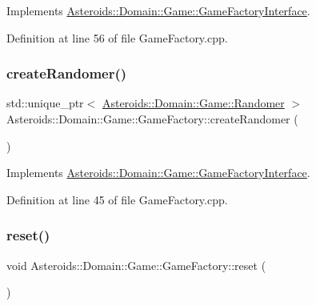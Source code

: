 Implements \hyperlink{classAsteroids_1_1Domain_1_1Game_1_1GameFactoryInterface_a40f7aecd06daa206b762bfc7896bd47c}{Asteroids\+::\+Domain\+::\+Game\+::\+Game\+Factory\+Interface}.



Definition at line 56 of file Game\+Factory.\+cpp.

\mbox{\label{classAsteroids_1_1Domain_1_1Game_1_1GameFactory_ab46d642aa48fd4de15a0de8d7a425f1d}} 
\subsubsection{\texorpdfstring{create\+Randomer()}{createRandomer()}}
{\footnotesize\ttfamily std\+::unique\+\_\+ptr$<$ \hyperlink{classAsteroids_1_1Domain_1_1Game_1_1Randomer}{Asteroids\+::\+Domain\+::\+Game\+::\+Randomer} $>$ Asteroids\+::\+Domain\+::\+Game\+::\+Game\+Factory\+::create\+Randomer (\begin{DoxyParamCaption}{ }\end{DoxyParamCaption})\hspace{0.3cm}{\ttfamily [virtual]}}



Implements \hyperlink{classAsteroids_1_1Domain_1_1Game_1_1GameFactoryInterface_a787a72445e1bc61ef5911b7bbbf18929}{Asteroids\+::\+Domain\+::\+Game\+::\+Game\+Factory\+Interface}.



Definition at line 45 of file Game\+Factory.\+cpp.

\mbox{\label{classAsteroids_1_1Domain_1_1Game_1_1GameFactory_a9be2f29f1827928b0145ce42848c11b1}} 
\subsubsection{\texorpdfstring{reset()}{reset()}}
{\footnotesize\ttfamily void Asteroids\+::\+Domain\+::\+Game\+::\+Game\+Factory\+::reset (\begin{DoxyParamCaption}{ }\end{DoxyParamCaption})}



